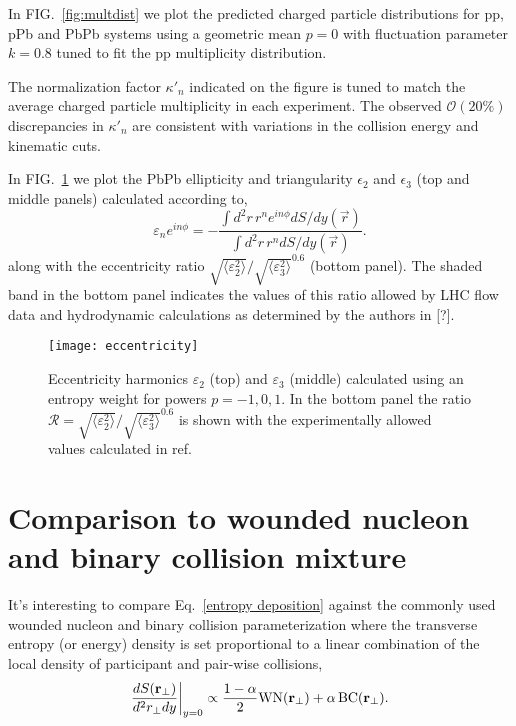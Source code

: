 \documentclass[aps,prl,reprint,amsmath,nofootinbib]{revtex4-1}
\begin{document}
In FIG.~\ref{fig:multdist} we plot the predicted charged particle distributions for pp, pPb and PbPb systems
using a geometric mean $p=0$ with fluctuation parameter $k=0.8$ tuned to fit the pp multiplicity
distribution.

The normalization factor $\kappa'_n$ indicated on the figure is tuned to match the average charged particle
multiplicity in each experiment. The observed $\mathcal{O}(20\%)$ discrepancies in $\kappa'_n$ are consistent
with variations in the collision energy and kinematic cuts.

In FIG.~\ref{fig:eccen} we plot the PbPb ellipticity and triangularity $\epsilon_2$ and $\epsilon_3$ (top
and middle panels) calculated according to,
\begin{equation}
  \varepsilon_n e^{i n\phi} = -\frac{\int d^2r\, r^n e^{i n \phi} dS/dy(\vec{r})}{\int d^2r\, r^n dS/dy(\vec{r})}.
\end{equation}
along with the eccentricity ratio $\sqrt{\langle \varepsilon_2^2 \rangle}/\sqrt{\langle \varepsilon_3^2
\rangle}^{0.6}$ (bottom panel). The shaded band in the bottom panel indicates the values of this ratio allowed
by LHC flow data and hydrodynamic calculations as determined by the authors in [?].

\begin{figure}[t]
  \texttt{[image: eccentricity]}
  \caption{\label{fig:eccen}Eccentricity harmonics $\varepsilon_2$ (top) and $\varepsilon_3$ (middle)
  calculated using an entropy weight for powers $p=-1,0,1$.  In the bottom panel the ratio $\mathcal{R} =
  \sqrt{\langle \varepsilon_2^2 \rangle}/\sqrt{\langle \varepsilon_3^2 \rangle}^{0.6}$ is shown with the
  experimentally allowed values calculated in ref.\ \cite{constraining-ic}}
\end{figure}

\section{Comparison to wounded nucleon and binary collision mixture}

It's interesting to compare Eq.~\eqref{entropy deposition} against the commonly used wounded nucleon and
binary collision parameterization where the transverse entropy (or energy) density is set proportional to a
linear combination of the local density of participant and pair-wise collisions,
\begin{equation}
  \label{glb ansatz}
  \frac{dS({\bf r}_\perp)}{d^2r_\perp dy} \biggr \rvert_{y=0} \propto
  \frac{1-\alpha}{2}\mbox{WN}({\bf r_\perp}) + \alpha\, \mbox{BC}({\bf r_\perp}).
\end{equation}
\end{document}
